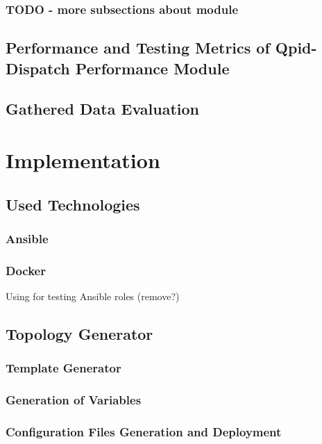 \subsection{TODO - more subsections about module}

\section{Performance and Testing Metrics of Qpid-Dispatch Performance Module}

\section{Gathered Data Evaluation}

\chapter{Implementation}

\section{Used Technologies}

\subsection{Ansible}

\subsection{Docker}
Using for testing Ansible roles (remove?)

\section{Topology Generator}

\subsection{Template Generator}

\subsection{Generation of Variables}

\subsection{Configuration Files Generation and Deployment}

